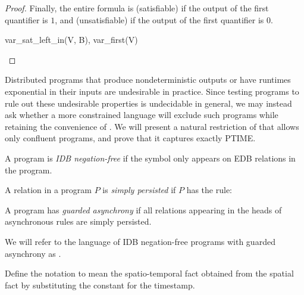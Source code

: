 \begin{proof}
Finally, the entire formula is  (satisfiable) if the output of the first quantifier is $1$, and  (unsatisfiable) if the output of the first quantifier is $0$.

\begin{Drules}
        {var_sat_left_in(V, B), var_first(V)}
\end{Drules}
\end{proof}

Distributed programs that produce nondeterministic outputs or have
runtimes exponential in their inputs are undesirable in practice.  Since testing
\lang programs to rule out these undesirable properties is undecidable in
general, we may instead ask whether a more constrained language will exclude
such programs while retaining the convenience of \lang.  We will present a
natural restriction of \lang that allows only confluent programs, and prove that
it captures exactly PTIME.

\begin{definition}
A \lang program is {\em IDB negation-free} if the \dedalus{!} symbol only appears on EDB relations in the program.
\end{definition}

\begin{definition}
A relation  in a program $P$ is {\em simply persisted} if $P$ has the rule: 
\end{definition}

\begin{definition}
A \lang program has {\em guarded asynchrony} if all relations appearing in the heads of asynchronous rules are simply persisted.
\end{definition}

We will refer to the language of IDB negation-free \lang programs with guarded asynchrony as \slang.

Define the notation  to mean the spatio-temporal fact obtained from the spatial fact  by substituting the constant  for the timestamp.

